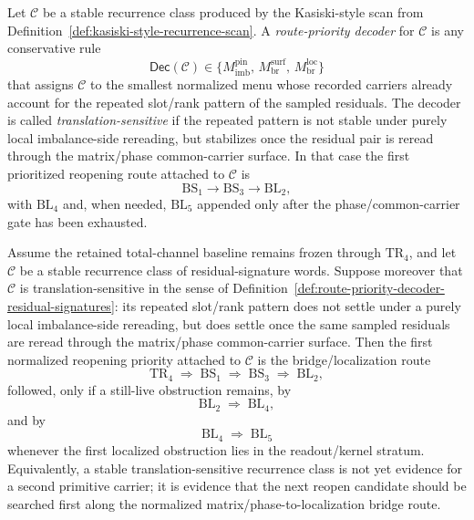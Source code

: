 \begin{definition}
\label{def:route-priority-decoder-residual-signatures}
Let \(\mathcal C\) be a stable recurrence class produced by the Kasiski-style scan from Definition~\ref{def:kasiski-style-recurrence-scan}. A \emph{route-priority decoder} for \(\mathcal C\) is any conservative rule
\[
\mathsf{Dec}(\mathcal C)\in \bigl\{M^{\mathrm{pin}}_{\mathrm{imb}},\,M^{\mathrm{surf}}_{\mathrm{br}},\,M^{\mathrm{loc}}_{\mathrm{br}}\bigr\}
\]
that assigns \(\mathcal C\) to the smallest normalized menu whose recorded carriers already account for the repeated slot/rank pattern of the sampled residuals.
The decoder is called \emph{translation-sensitive} if the repeated pattern is not stable under purely local imbalance-side rereading, but stabilizes once the residual pair is reread through the matrix/phase common-carrier surface. In that case the first prioritized reopening route attached to \(\mathcal C\) is
\[
\mathrm{BS}_1 \to \mathrm{BS}_3 \to \mathrm{BL}_2,
\]
with \(\mathrm{BL}_4\) and, when needed, \(\mathrm{BL}_5\) appended only after the phase/common-carrier gate has been exhausted.
\end{definition}

\begin{proposition}
\label{prop:translation-sensitive-signature-classes-prioritize-bs-bl-route}
Assume the retained total-channel baseline remains frozen through \(\mathrm{TR}_4\), and let \(\mathcal C\) be a stable recurrence class of residual-signature words. Suppose moreover that \(\mathcal C\) is translation-sensitive in the sense of Definition~\ref{def:route-priority-decoder-residual-signatures}: its repeated slot/rank pattern does not settle under a purely local imbalance-side rereading, but does settle once the same sampled residuals are reread through the matrix/phase common-carrier surface. Then the first normalized reopening priority attached to \(\mathcal C\) is the bridge/localization route
\[
\mathrm{TR}_4 \;\Longrightarrow\; \mathrm{BS}_1 \;\Longrightarrow\; \mathrm{BS}_3 \;\Longrightarrow\; \mathrm{BL}_2,
\]
followed, only if a still-live obstruction remains, by
\[
\mathrm{BL}_2 \;\Longrightarrow\; \mathrm{BL}_4,
\]
and by
\[
\mathrm{BL}_4 \;\Longrightarrow\; \mathrm{BL}_5
\]
whenever the first localized obstruction lies in the readout/kernel stratum.
Equivalently, a stable translation-sensitive recurrence class is not yet evidence for a second primitive carrier; it is evidence that the next reopen candidate should be searched first along the normalized matrix/phase-to-localization bridge route.
\end{proposition}


